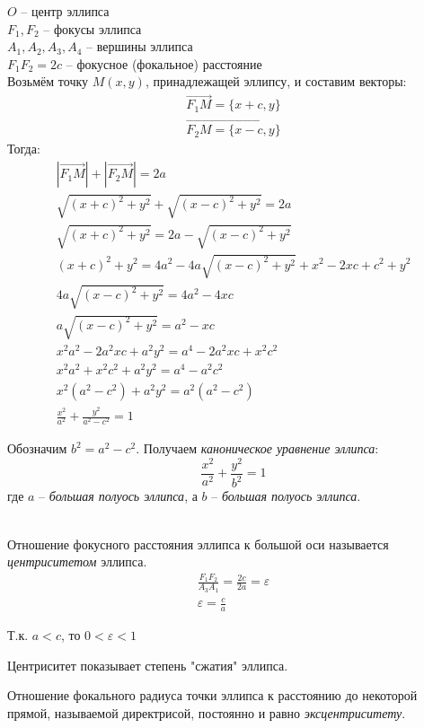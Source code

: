 $O$ -- центр эллипса \\
 $F_1, F_2$ -- фокусы эллипса \\
 $A_1, A_2, A_3, A_4$ -- вершины эллипса \\
$F_1F_2 = 2c$  -- фокусное (фокальное) расстояние\\
Возьмём точку $M(x, y)$, принадлежащей эллипсу, и составим векторы:
\begin{gather*}
  \overrightarrow{F_1M} = \{x + c, y\} \\
  \overrightarrow{F_2M = \{x - c, y\} }
\end{gather*}
Тогда:
\begin{gather*}
  |\overrightarrow{F_1M}| + |\overrightarrow{F_2M}| = 2a \\
  \sqrt{(x + c)^2 + y^2} + \sqrt{(x - c)^2 + y^2} = 2a \\
  \sqrt{(x + c)^2 + y^2} = 2a - \sqrt{(x - c)^2 + y^2} \\
  (x + c)^2 + y^2 = 4a^2 - 4a\sqrt{(x - c)^2 + y^2} + x^2 - 2xc + c^2 + y^2 \\
  4a\sqrt{(x - c)^2 + y^2} = 4a^2 - 4xc \\
  a\sqrt{(x - c)^2 + y^2} = a^2 - xc \\
  x^2 a^2 - 2a^2xc + a^2y^2 = a^4 - 2a^2xc + x^2c^2 \\
  x^2a^2 + x^2c^2 + a^2y^2 = a^4 - a^2c^2 \\
  x^2(a^2 - c^2) + a^2y^2 = a^2(a^2 - c^2) \\
  \frac{x^2}{a^2} + \frac{y^2}{a^2 - c^2} = 1
\end{gather*} 

Обозначим $b^2 = a^2 - c^2$. Получаем \textit{каноническое уравнение эллипса}: \[
  \boxed{\frac{x^2}{a^2} + \frac{y^2}{b^2} = 1}
\]  
где $a$ -- \textit{большая полуось эллипса}, а  $b$ -- \textit{большая полуось эллипса}.


\\
Отношение фокусного расстояния эллипса к большой оси называется \textit{центриситетом} эллипса. 
\begin{gather*}
  \frac{F_1F_2}{A_3A_1} = \frac{2c}{2a} = \varepsilon \\
  \boxed{\varepsilon = \frac{c}{a}}
\end{gather*}
\begin{note}
  Т.к. $a < c$, то $0 < \varepsilon < 1$
\end{note}

Центриситет показывает степень "сжатия" эллипса.

Отношение фокального радиуса точки эллипса к расстоянию до некоторой прямой, называемой директрисой, постоянно и равно \textit{эксцентриситету}. 


